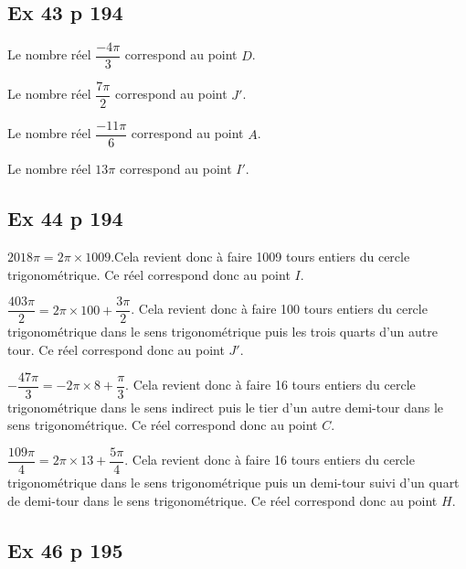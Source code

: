 \documentclass[a4paper,french]{book}
\begin{document}
\vspace{-0.2cm}

\subsection*{Ex 43 p 194}

\begin{enumMet}
    \item Le nombre réel $\dfrac{-4\pi}{3}$ correspond au point $D$.
    \item Le nombre réel $\dfrac{7\pi}{2}$ correspond au point $J'$.
    \item Le nombre réel $\dfrac{-11\pi}{6}$ correspond au point $A$.
    \item Le nombre réel $13\pi$ correspond au point $I'$.
\end{enumMet}

\vspace{-0.2cm}

\subsection*{Ex 44 p 194}

\begin{enumMet}
    \item $2018\pi=2\pi\times1009$.Cela revient donc à faire 1009 tours entiers du cercle trigonométrique. Ce réel correspond donc au point $I$. 
    \item $\dfrac{403\pi}{2}=2\pi\times100+\dfrac{3\pi}{2}$. Cela revient donc à faire 100 tours entiers du cercle trigonométrique dans le sens trigonométrique puis les trois quarts d’un autre tour. Ce réel correspond donc au point $J'$.
    \item $-\dfrac{47\pi}{3}=-2\pi\times8+\dfrac{\pi}{3}$. Cela revient donc à faire 16 tours entiers du cercle trigonométrique dans le sens indirect puis le tier d’un autre demi-tour dans le sens trigonométrique. Ce réel correspond donc au point $C$.
    \item $\dfrac{109\pi}{4}=2\pi\times13+\dfrac{5\pi}{4}$. Cela revient donc à faire 16 tours entiers du cercle trigonométrique dans le sens trigonométrique puis un demi-tour suivi d'un quart de demi-tour dans le sens trigonométrique. Ce réel correspond donc au point $H$.
\end{enumMet}

\subsection*{Ex 46 p 195}
\end{document}
